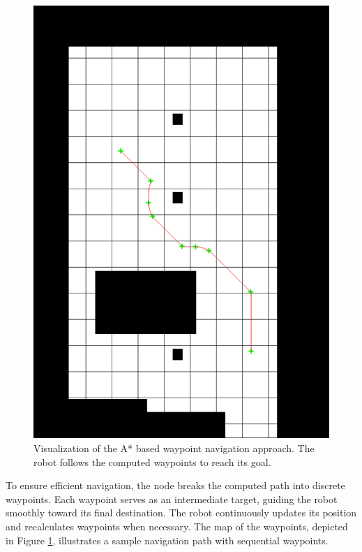 \documentclass{CSSRforAfrica}
\begin{document}
\begin{figure}[H]
\begin{minipage}{0.49\textwidth}
        \includegraphics[width=\linewidth]{Images/environmentMapWaypointsAstar.png}
        \caption{Visualization of the A* based waypoint navigation approach. The robot follows the computed waypoints to reach its goal.}
        \label{fig:waypoint_map}
    \end{minipage}
\end{figure}
\noindent To ensure efficient navigation, the node breaks the computed path into discrete waypoints. Each waypoint serves as an intermediate target, guiding the robot smoothly toward its final destination. The robot continuously updates its position and recalculates waypoints when necessary. The map of the waypoints, depicted in Figure \ref{fig:waypoint_map}, illustrates a sample navigation path with sequential waypoints.\\
\end{document}
